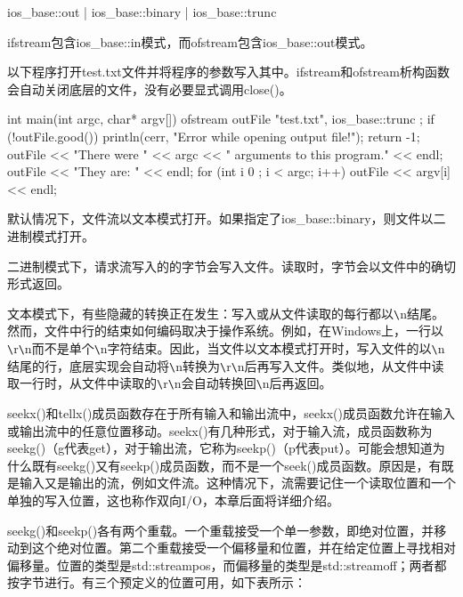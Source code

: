 \begin{cpp}
ios_base::out | ios_base::binary | ios_base::trunc
\end{cpp}

ifstream包含ios\_base::in模式，而ofstream包含ios\_base::out模式。

以下程序打开test.txt文件并将程序的参数写入其中。ifstream和ofstream析构函数会自动关闭底层的文件，没有必要显式调用close()。


\begin{cpp}
int main(int argc, char* argv[])
{
    ofstream outFile { "test.txt", ios_base::trunc };
    if (!outFile.good()) {
        println(cerr, "Error while opening output file!");
        return -1;
    }
    outFile << "There were " << argc << " arguments to this program." << endl;
    outFile << "They are: " << endl;
    for (int i { 0 }; i < argc; i++) {
        outFile << argv[i] << endl;
    }
}
\end{cpp}


默认情况下，文件流以文本模式打开。如果指定了ios\_base::binary，则文件以二进制模式打开。

二进制模式下，请求流写入的的字节会写入文件。读取时，字节会以文件中的确切形式返回。

文本模式下，有些隐藏的转换正在发生：写入或从文件读取的每行都以\verb|\|n结尾。然而，文件中行的结束如何编码取决于操作系统。例如，在Windows上，一行以\verb|\|r\verb|\|n而不是单个\verb|\|n字符结束。因此，当文件以文本模式打开时，写入文件的以\verb|\|n结尾的行，底层实现会自动将\verb|\|n转换为\verb|\|r\verb|\|n后再写入文件。类似地，从文件中读取一行时，从文件中读取的\verb|\|r\verb|\|n会自动转换回\verb|\|n后再返回。


seekx()和tellx()成员函数存在于所有输入和输出流中，seekx()成员函数允许在输入或输出流中的任意位置移动。seekx()有几种形式，对于输入流，成员函数称为seekg()（g代表get），对于输出流，它称为seekp()（p代表put）。可能会想知道为什么既有seekg()又有seekp()成员函数，而不是一个seek()成员函数。原因是，有既是输入又是输出的流，例如文件流。这种情况下，流需要记住一个读取位置和一个单独的写入位置，这也称作双向I/O，本章后面将详细介绍。

seekg()和seekp()各有两个重载。一个重载接受一个单一参数，即绝对位置，并移动到这个绝对位置。第二个重载接受一个偏移量和位置，并在给定位置上寻找相对偏移量。位置的类型是std::streampos，而偏移量的类型是std::streamoff；两者都按字节进行。有三个预定义的位置可用，如下表所示：

